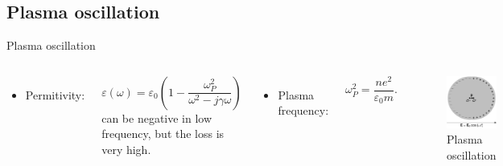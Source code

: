\subsection{Plasma oscillation}

\begin{frame}{Plasma oscillation}
    \begin{columns}
        
        \vspace{2mm}
        \begin{itemize}
            \item Permitivity:
        \end{itemize}
        \begin{equation*}
            \varepsilon (\omega) = \varepsilon_0 \left(1 -  \dfrac{\omega_P^2}{\omega^2 - j \gamma \omega } \right)
        \end{equation*}
        can be negative in low frequency, but the loss is very high.
        \vspace{5mm}
        \begin{itemize}
            \item Plasma frequency:
        \end{itemize}
        \begin{equation*}
            \omega_P^2 = \dfrac{ne^2}{\varepsilon_0 m}.
        \end{equation*}

        \begin{figure}
            \centering
            \includegraphics[width=\textwidth]{Figures/Rayleigh_scattering.pdf}
            \caption{Plasma oscillation}
            \label{fig:Plasma oscillation}
        \end{figure}
    \end{columns}
\end{frame}